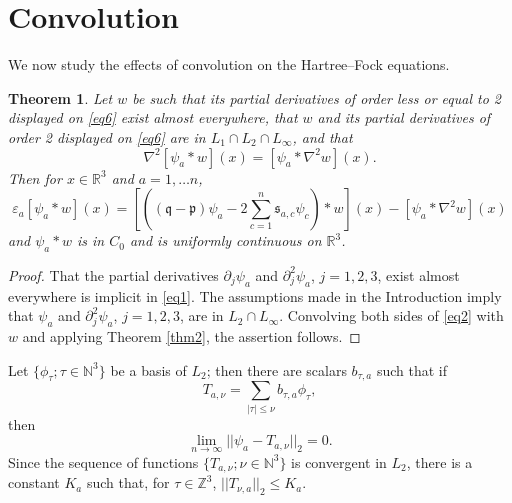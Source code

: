\documentclass[english, reqno]{amsart}
\newtheorem{thm}{Theorem}[]
\newcommand{\del}{\mbox{$\partial$}}
\newcommand{\IR}{\text{${\mathbb{R}}$}}
\newcommand{\IZ}{\text{${\mathbb{Z}}$}}
\newcommand{\IN}{\text{${\mathbb{N}}$}}
\newcommand{\p}{\mathfrak{p}}
\newcommand{\q}{\mathfrak{q}}
\newcommand{\s}{\mathfrak{s}}
\begin{document}
\section{Convolution} \label{section 4}
We now study the effects of convolution on the Hartree--Fock equations. 
\begin{thm} \label{thm3}
Let $w$ be such that its partial derivatives of order less or equal to 2 displayed on \eqref{eq6} exist almost everywhere, that $w$ and its partial derivatives of order 2  displayed on \eqref{eq6} are in $ L_1\cap L_2 \cap L_{\infty}$,  and that
\[
\nabla^2[\psi_a \ast w](x)= [\psi_a\ast \nabla^2w](x).
\]
Then for $x \in \IR^3$ and $a=1, \dots n$,
\begin{equation} \label{eq10}
 \varepsilon_a [\psi_a \ast w](x)=
\left [\left ( (\q - \p) \psi _a-2\sum_{c=1}^n \s_{a,c}\psi_{c}\right )\ast w\right ](x) -[\psi_{a}\ast \nabla^2w](x)
\end{equation}
and $\psi _a\ast w$ is in $C_0$  and is uniformly continuous on $\IR^3$.
\end{thm}
\begin{proof}
That the partial derivatives $\del_j\psi_a$ and  $\del^2_j\psi_a$, $j=1, 2, 3$, exist almost everywhere is implicit in \eqref{eq1}. The assumptions made in the Introduction imply that $\psi_a$ and $\del^2_j\psi_a$, $j=1, 2, 3$, are in $L_2\cap L_{\infty}$.  Convolving both sides of \eqref{eq2} with $w$ and applying Theorem \ref{thm2},  the assertion follows.
 \end{proof}
 Let $\{\phi_{\tau}; \tau \in \IN^3\}$ be a basis of $L_2$; then there are scalars $b_{\tau,a}$ such  that if
 \[
 T_{a,\nu}=\sum_{|\tau| \le \nu} b_{\tau,a}\phi_{\tau},
 \]
 then 
 \[
 \lim_{n\rightarrow \infty} ||\psi _a-  T_{a,\nu}||_2=0.
 \] 
 Since the sequence of functions $\{T_{a,\nu}; \nu \in \IN^3\}$ is convergent in $L_2$, there is a constant $K_a$ such that, for $\tau \in \IZ^3$,
$||T_{\nu,a}||_2 \le K_a$.
\end{document}
